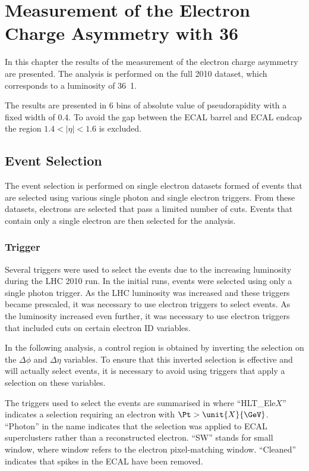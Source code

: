 \chapter[Electron Charge Asymmetry]{Measurement of the Electron Charge Asymmetry
 with \unit{36}{\invpb} }
\label{chap:analysis}

In this chapter the results of the measurement of the electron charge
asymmetry are presented. The analysis is performed on the full 2010 dataset, which corresponds to a
luminosity of \unit{36.1}{\invpb}.

The results are presented in 6 bins of absolute value of pseudorapidity with a
fixed width of 0.4. To avoid the gap between the ECAL barrel and ECAL endcap the
region $1.4<|\eta|<1.6$ is excluded.

\section{Event Selection}

The event selection is performed on single electron datasets formed of events
that are selected using various single photon and single electron triggers. From
these datasets, electrons are selected that pass a limited number of cuts.
Events that contain only a single electron are then selected for the analysis.

\subsection{Trigger}

Several triggers were used to select the events due to the increasing luminosity
during the \ac{LHC} 2010 run.  In the initial runs, events were selected using
only a single photon trigger.  As the \ac{LHC} luminosity was increased and
these triggers became prescaled, it was necessary to use electron triggers to
select events.  As the luminosity increased even further, it was necessary to use
electron triggers that included cuts on certain electron ID variables.

In the following analysis, a control region is obtained by inverting the
selection on the $\Delta\phi$ and $\Delta\eta$ variables. To ensure that this
inverted selection is effective and will actually select events, it is necessary
to avoid using triggers that apply a selection on these variables.

The triggers used to select the events are summarised in 
where ``HLT\_Ele$X$'' indicates a selection requiring an electron with  $\Pt > \unit{X}{\GeV}$. 
``Photon'' in the name indicates that the selection was applied to ECAL
superclusters rather than a reconstructed electron. 
``SW'' stands for small window, where window refers to the electron
pixel-matching window. 
 ``Cleaned'' indicates that spikes in the \ac{ECAL} have been removed.  

